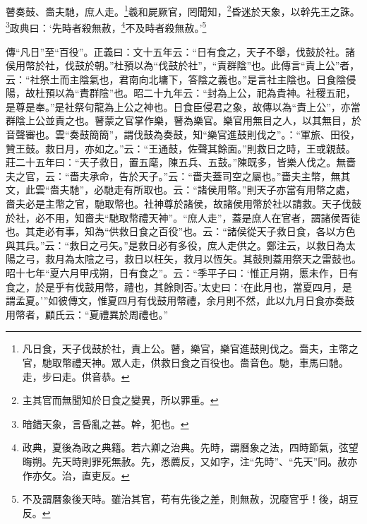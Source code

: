 瞽奏鼓、嗇夫馳，庶人走。\footnote{凡日食，天子伐鼓於社，責上公。瞽，樂官，樂官進鼓則伐之。嗇夫，主幣之官，馳取幣禮天神。眾人走，供救日食之百役也。嗇音色。馳，車馬曰馳。走，步曰走。供音恭。}羲和屍厥官，罔聞知，\footnote{主其官而無聞知於日食之變異，所以罪重。}昏迷於天象，以幹先王之誅。\footnote{暗錯天象，言昏亂之甚。幹，犯也。}政典曰：‘先時者殺無赦，\footnote{政典，夏後為政之典籍。若六卿之治典。先時，謂曆象之法，四時節氣，弦望晦朔。先天時則罪死無赦。先，悉薦反，又如字，注“先時”、“先天”同。赦亦作亦攵。治，直吏反。}不及時者殺無赦。’\footnote{不及謂曆象後天時。雖治其官，苟有先後之差，則無赦，況廢官乎！後，胡豆反。}

{\noindent\zhuan{}\fzbyks 傳“凡日”至“百役”。正義曰：文十五年云：“日有食之，天子不舉，伐鼓於社。諸侯用幣於社，伐鼓於朝。”杜預以為“伐鼓於社”，“責群陰”也。此傳言“責上公”者，云：“社祭土而主陰氣也，君南向北墉下，答陰之義也。”是言社主陰也。日食陰侵陽，故杜預以為“責群陰”也。昭二十九年云：“封為上公，祀為貴神。社稷五祀，是尊是奉。”是社祭句龍為上公之神也。日食臣侵君之象，故傳以為“責上公”，亦當群陰上公並責之也。瞽蒙之官掌作樂，瞽為樂官。樂官用無目之人，以其無目，於音聲審也。雲“奏鼓簡簡”，謂伐鼓為奏鼓，知“樂官進鼓則伐之”。：“軍旅、田役，贊王鼓。救日月，亦如之。”云：“王通鼓，佐聲其餘面。”則救日之時，王或親鼓。莊二十五年曰：“天子救日，置五麾，陳五兵、五鼓。”陳既多，皆樂人伐之。無嗇夫之官，云：“嗇夫承命，告於天子。”云：“嗇夫蓋司空之屬也。”嗇夫主幣，無其文，此雲“嗇夫馳”，必馳走有所取也。云：“諸侯用幣。”則天子亦當有用幣之處，嗇夫必是主幣之官，馳取幣也。社神尊於諸侯，故諸侯用幣於社以請救。天子伐鼓於社，必不用，知嗇夫“馳取幣禮天神”。“庶人走”，蓋是庶人在官者，謂諸侯胥徒也。其走必有事，知為“供救日食之百役”也。云：“諸侯從天子救日食，各以方色與其兵。”云：“救日之弓矢。”是救日必有多役，庶人走供之。鄭注云，以救日為太陽之弓，救月為太陰之弓，救日以枉矢，救月以恆矢。其鼓則蓋用祭天之雷鼓也。昭十七年“夏六月甲戌朔，日有食之”。云：“季平子曰：‘惟正月朔，慝未作，日有食之，於是乎有伐鼓用幣，禮也，其餘則否。’太史曰：‘在此月也，當夏四月，是謂孟夏。’”如彼傳文，惟夏四月有伐鼓用幣禮，余月則不然，此以九月日食亦奏鼓用幣者，顧氏云：“夏禮異於周禮也。” \par}

